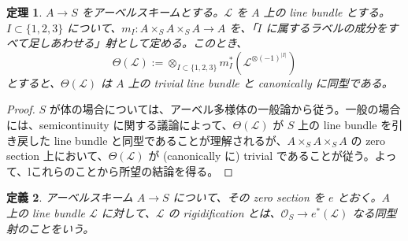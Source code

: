 \documentclass{jsarticle}
\newtheorem{thm}{定理}
\newtheorem{defn}[thm]{定義}
\begin{document}
\newpage
\begin{thm}
  $A \to S$ をアーベルスキームとする。$\mathcal{L}$ を $A$ 上の line bundle とする。$I \subset \{1, 2, 3\}$ について、$m_I \colon A \times_S A \times_S A \to A$ を、「$I$ に属するラベルの成分をすべて足しあわせる」射として定める。このとき、
  \[
    \Theta(\mathcal{L}) := \otimes_{I \subset \{1, 2, 3\}} m_I^*(\mathcal{L}^{\otimes (-1)^{|I|}})
  \]
  とすると、$\Theta(\mathcal{L})$ は $A$ 上の trivial line bundle と canonically に同型である。
\end{thm}
\begin{proof}
  $S$ が体の場合については、アーベル多様体の一般論から従う。一般の場合には、semicontinuity に関する議論によって、$\Theta(\mathcal{L})$ が $S$ 上の line bundle を引き戻した line bundle と同型であることが理解されるが、$A \times_S A \times_S A$ の zero section 上において、$\Theta(\mathcal{L})$ が (canonically に) trivial であることが従う。よって、lこれらのことから所望の結論を得る。
\end{proof}

\begin{defn}
  アーベルスキーム $A \to S$ について、その zero section を $e$ とおく。$A$ 上の line bundle $\mathcal{L}$ に対して、$\mathcal{L}$ の rigidification とは、$\mathcal{O}_S \to e^*(\mathcal{L})$ なる同型射のことをいう。
\end{defn}
\end{document}
